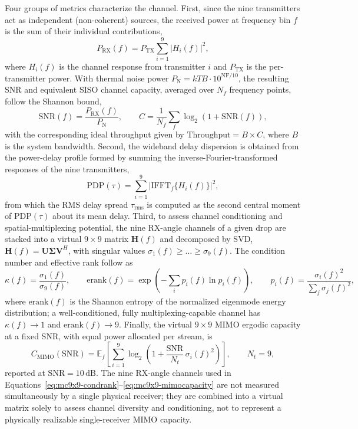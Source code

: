 Four groups of metrics characterize the channel. First, since the nine transmitters act as independent (non-coherent) sources, the received power at frequency bin $f$ is the sum of their individual contributions,
\begin{equation}
    P_\mathrm{RX}(f) = P_\mathrm{TX}\sum_{i=1}^{9}\left|H_i(f)\right|^2,
    \label{eq:mc9x9-prx}
\end{equation}
where $H_i(f)$ is the channel response from transmitter $i$ and $P_\mathrm{TX}$ is the per-transmitter power. With thermal noise power $P_\mathrm{N}=kTB\cdot10^{\mathrm{NF}/10}$, the resulting SNR and equivalent SISO channel capacity, averaged over $N_f$ frequency points, follow the Shannon bound,
\begin{equation}
    \mathrm{SNR}(f) = \frac{P_\mathrm{RX}(f)}{P_\mathrm{N}}, \qquad
    C = \frac{1}{N_f}\sum_{f}\log_2\!\left(1+\mathrm{SNR}(f)\right),
    \label{eq:mc9x9-capacity}
\end{equation}
with the corresponding ideal throughput given by $\mathrm{Throughput}=B\times C$, where $B$ is the system bandwidth. Second, the wideband delay dispersion is obtained from the power-delay profile formed by summing the inverse-Fourier-transformed responses of the nine transmitters,
\begin{equation}
    \mathrm{PDP}(\tau)=\sum_{i=1}^{9}\left|\mathrm{IFFT}_f\{H_i(f)\}\right|^2,
    \label{eq:mc9x9-pdp}
\end{equation}
from which the RMS delay spread $\tau_\mathrm{rms}$ is computed as the second central moment of $\mathrm{PDP}(\tau)$ about its mean delay. Third, to assess channel conditioning and spatial-multiplexing potential, the nine RX-angle channels of a given drop are stacked into a virtual $9\times9$ matrix $\mathbf{H}(f)$ and decomposed by SVD, $\mathbf{H}(f)=\mathbf{U}\boldsymbol\Sigma\mathbf{V}^{H}$, with singular values $\sigma_1(f)\ge\dots\ge\sigma_9(f)$. The condition number and effective rank follow as
\begin{equation}
    \kappa(f) = \frac{\sigma_1(f)}{\sigma_9(f)}, \qquad
    \mathrm{erank}(f) = \exp\!\left(-\sum_{i} p_i(f)\ln p_i(f)\right), \qquad
    p_i(f) = \frac{\sigma_i(f)^2}{\sum_{j}\sigma_j(f)^2},
    \label{eq:mc9x9-condrank}
\end{equation}
where $\mathrm{erank}(f)$ is the Shannon entropy of the normalized eigenmode energy distribution; a well-conditioned, fully multiplexing-capable channel has $\kappa(f)\to1$ and $\mathrm{erank}(f)\to9$. Finally, the virtual $9\times9$ MIMO ergodic capacity at a fixed SNR, with equal power allocated per stream, is
\begin{equation}
    C_\mathrm{MIMO}(\mathrm{SNR}) = \mathbb{E}_f\!\left[\sum_{i=1}^{9}\log_2\!\left(1+\frac{\mathrm{SNR}}{N_t}\,\sigma_i(f)^2\right)\right], \qquad N_t=9,
    \label{eq:mc9x9-mimocapacity}
\end{equation}
reported at $\mathrm{SNR}=10\,\text{dB}$. The nine RX-angle channels used in Equations~\ref{eq:mc9x9-condrank}--\ref{eq:mc9x9-mimocapacity} are not measured simultaneously by a single physical receiver; they are combined into a virtual matrix solely to assess channel diversity and conditioning, not to represent a physically realizable single-receiver MIMO capacity.


